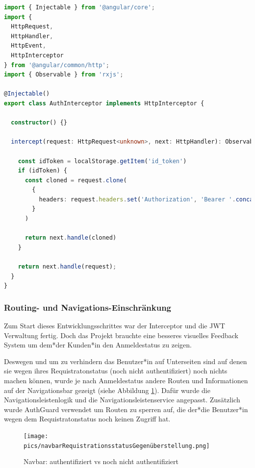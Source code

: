 \begin{lstlisting}[caption=auth.interceptor.ts - add JWT to Request Header,label=lst:impl:sign:JWTInterceptor,language=TypeScript]
import { Injectable } from '@angular/core';
import {
  HttpRequest,
  HttpHandler,
  HttpEvent,
  HttpInterceptor
} from '@angular/common/http';
import { Observable } from 'rxjs';

@Injectable()
export class AuthInterceptor implements HttpInterceptor {

  constructor() {}

  intercept(request: HttpRequest<unknown>, next: HttpHandler): Observable<HttpEvent<unknown>> {

    const idToken = localStorage.getItem('id_token')
    if (idToken) {
      const cloned = request.clone(
        {
          headers: request.headers.set('Authorization', 'Bearer '.concat(idToken))
        }
      )

      return next.handle(cloned)
    }

    return next.handle(request);
  }
}
\end{lstlisting}

\subsubsection{Routing- und Navigations-Einschränkung}
Zum Start dieses Entwicklungsschrittes war der Interceptor und die JWT Verwaltung fertig. Doch das Projekt brauchte eine besseres visuelles Feedback System um dem*der Kunden*in den Anmeldestatus zu zeigen.

Deswegen und um zu verhindern das Benutzer*in auf Unterseiten sind auf denen sie wegen ihres Requistratonstatus (noch nicht authentifiziert) noch nichts machen können, wurde je nach Anmeldestatus andere Routen und Informationen auf der Navigationsbar gezeigt (siehe Abbildung \ref{fig:impl:navbarvergleich}). Dafür wurde die Navigationsleistenlogik und die Navigationsleistenservice angepasst. Zusätzlich wurde AuthGuard verwendet um Routen zu sperren auf, die der*die Benutzer*in wegen dem Requistratonstatus noch keinen Zugriff hat. 

\begin{figure}
  \centering
  \texttt{[image: pics/navbarRequistrationsstatusGegenüberstellung.png]}
  \caption{Navbar: authentifiziert vs noch nicht authentifiziert}
  \label{fig:impl:navbarvergleich}
\end{figure}



